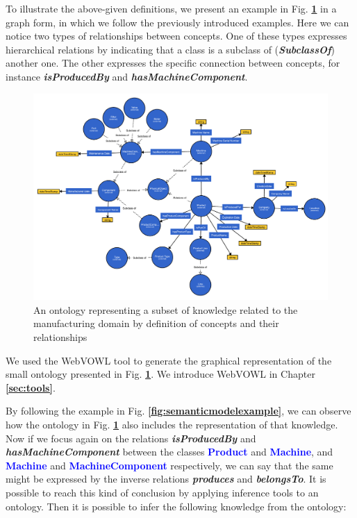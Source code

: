 \documentclass{guideline/sty/rapport}
\begin{document}
To illustrate the above-given definitions, we present an example in Fig. \textbf{\ref{fig:ontologyexample}} in a graph form, in which we follow the previously introduced examples. Here we can notice two types of relationships between concepts. One of these types expresses hierarchical relations by indicating that a class is a subclass of (\textbf{\textit{SubclassOf}}) another one. The other expresses the specific connection between concepts, for instance \textcolor{phthalogreen}{\textbf{\textit{isProducedBy}}} and \textcolor{phthalogreen}{\textbf{\textit{hasMachineComponent}}}.
    
    \begin{figure}[H]
        \centering
          \includegraphics[width=1\linewidth]{images/example-ontology.pdf}
          \caption{An ontology representing a subset of knowledge related to the manufacturing domain by definition of concepts and their relationships}
        \label{fig:ontologyexample}
    \end{figure}

\begin{beware}[Note]
We used the WebVOWL tool to generate the graphical representation of the small ontology presented in Fig. \textbf{\ref{fig:ontologyexample}}. We introduce WebVOWL in Chapter \textbf{\ref{sec:tools}}.
\end{beware}  \singlespacing

By following the example in Fig. \textbf{\ref{fig:semanticmodelexample}}, we can observe how the ontology in Fig. \textbf{\ref{fig:ontologyexample}} also includes the representation of that knowledge. Now if we focus again on the relations \textcolor{phthalogreen}{\textbf{\textit{isProducedBy}}} and \textcolor{phthalogreen}{\textbf{\textit{hasMachineComponent}}} between the classes \textcolor{blue}{\textbf{Product}} and \textcolor{blue}{\textbf{Machine}}, and \textcolor{blue}{\textbf{Machine}} and \textcolor{blue}{\textbf{MachineComponent}} respectively, we can say that the same might be expressed by the inverse relations \textcolor{phthalogreen}{\textbf{\textit{produces}}} and  \textcolor{phthalogreen}{\textbf{\textit{belongsTo}}}. It is possible to reach this kind of conclusion by applying inference tools to an ontology. Then it is possible to infer the following knowledge from the ontology: \\
\end{document}
